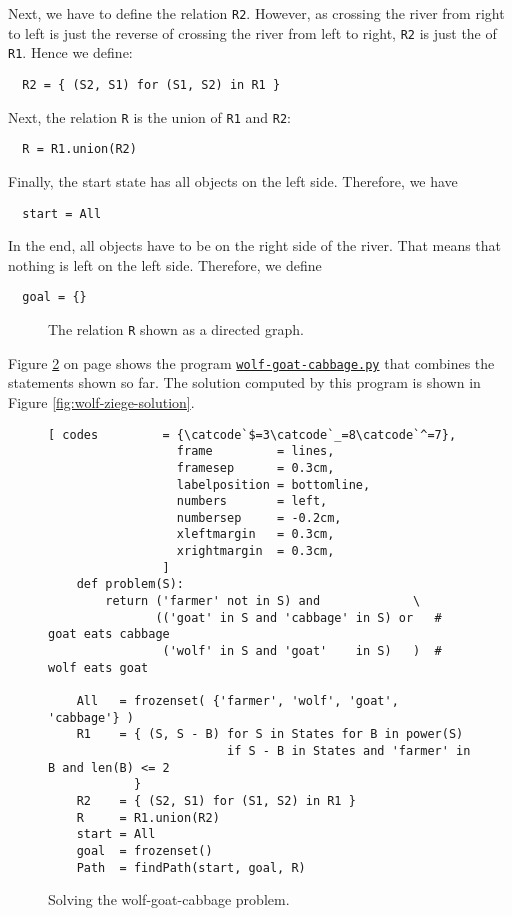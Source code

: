 Next, we have to define the relation \texttt{R2}.  However, as crossing the river from right to left
is just the reverse of crossing the river from left to right, \texttt{R2} is just the  of
\texttt{R1}.   Hence we define:
\begin{verbatim}
  R2 = { (S2, S1) for (S1, S2) in R1 }
\end{verbatim}
Next, the relation \texttt{R} is the union of \texttt{R1} and \texttt{R2}:
\begin{verbatim}
  R = R1.union(R2)
\end{verbatim}
Finally, the start state has all objects on the left side.  Therefore, we have
\begin{verbatim}
  start = All
\end{verbatim}
In the end, all objects have to be on the right side of the river.  That means that nothing is left
on the left side.  Therefore, we define
\begin{verbatim}
  goal = {}
\end{verbatim}


\begin{figure}[h]
  \centering


  \caption{The relation \texttt{R} shown as a directed graph.}
  \label{fig:wolf-goat-cabbage.pdf}
\end{figure}




Figure \ref{fig:wolf-ziege} on page \pageref{fig:wolf-ziege} shows the program
\href{https://github.com/karlstroetmann/Logic/blob/master/Python/wolf-goat-cabbage.py}{\texttt{wolf-goat-cabbage.py}}
that combines the statements shown so far.  The solution computed by this program is shown in Figure
 \ref{fig:wolf-ziege-solution}.

\begin{figure}[!ht]
  \centering
\begin{Verbatim}[ codes         = {\catcode`$=3\catcode`_=8\catcode`^=7},
                  frame         = lines, 
                  framesep      = 0.3cm, 
                  labelposition = bottomline,
                  numbers       = left,
                  numbersep     = -0.2cm,
                  xleftmargin   = 0.3cm,
                  xrightmargin  = 0.3cm,
                ]
    def problem(S):
        return ('farmer' not in S) and             \
               (('goat' in S and 'cabbage' in S) or   # goat eats cabbage
                ('wolf' in S and 'goat'    in S)   )  # wolf eats goat
    
    All   = frozenset( {'farmer', 'wolf', 'goat', 'cabbage'} )
    R1    = { (S, S - B) for S in States for B in power(S)
                         if S - B in States and 'farmer' in B and len(B) <= 2
            }
    R2    = { (S2, S1) for (S1, S2) in R1 }
    R     = R1.union(R2)
    start = All
    goal  = frozenset()
    Path  = findPath(start, goal, R)
\end{Verbatim} 
\vspace*{-0.3cm}
\caption{Solving the wolf-goat-cabbage problem.}  
\label{fig:wolf-ziege}
\end{figure}


